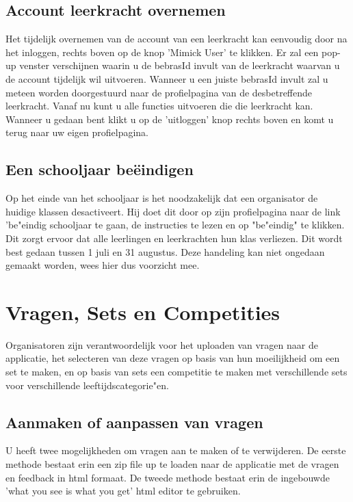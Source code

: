 \documentclass[11pt,a4paper]{report}
\begin{document}
\subsection{Account leerkracht overnemen}
Het tijdelijk overnemen van de account van een leerkracht kan eenvoudig door na het inloggen, rechts boven op de knop 'Mimick User' te klikken. Er zal een pop-up venster verschijnen waarin u de bebrasId invult van de leerkracht waarvan u de account tijdelijk wil uitvoeren. Wanneer u een juiste bebrasId invult zal u meteen worden doorgestuurd naar de profielpagina van de desbetreffende leerkracht. Vanaf nu kunt u alle functies uitvoeren die die leerkracht kan. Wanneer u gedaan bent klikt u op de 'uitloggen' knop rechts boven en komt u terug naar uw eigen profielpagina.

\subsection{Een schooljaar be\"eindigen}
Op het einde van het schooljaar is het noodzakelijk dat een organisator de huidige klassen desactiveert. Hij doet dit door op zijn profielpagina naar de link 'be"eindig schooljaar te gaan, de instructies te lezen en op "be"eindig" te klikken. Dit zorgt ervoor dat alle leerlingen en leerkrachten hun klas verliezen. Dit wordt best gedaan tussen 1 juli en 31 augustus. Deze handeling kan niet ongedaan gemaakt worden, wees hier dus voorzicht mee.

\section{Vragen, Sets en Competities}
Organisatoren zijn verantwoordelijk voor het uploaden van vragen naar de applicatie, het selecteren van deze vragen op basis van hun moeilijkheid om een set te maken, en op basis van sets een competitie te maken met verschillende sets voor verschillende leeftijdscategorie"en. 

\subsection{Aanmaken of aanpassen van vragen}
U heeft twee mogelijkheden om vragen aan te maken of te verwijderen. De eerste methode bestaat erin een zip file up te loaden naar de applicatie met de vragen en feedback in html formaat. De tweede methode bestaat erin de ingebouwde 'what you see is what you get' html editor te gebruiken. 
\end{document}
